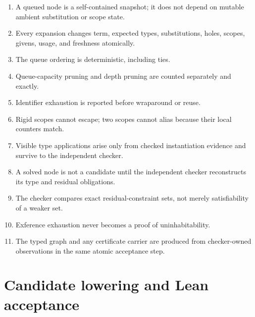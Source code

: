 \documentclass[10pt,letterpaper,oneside]{report}
\begin{document}
\begin{enumerate}
  \item A queued node is a self-contained snapshot; it does not depend on mutable ambient substitution or scope state.
  \item Every expansion changes term, expected types, substitutions, holes, scopes, givens, usage, and freshness atomically.
  \item The queue ordering is deterministic, including ties.
  \item Queue-capacity pruning and depth pruning are counted separately and exactly.
  \item Identifier exhaustion is reported before wraparound or reuse.
  \item Rigid scopes cannot escape; two scopes cannot alias because their local counters match.
  \item Visible type applications arise only from checked instantiation evidence and survive to the independent checker.
  \item A solved node is not a candidate until the independent checker reconstructs its type and residual obligations.
  \item The checker compares exact residual-constraint sets, not merely satisfiability of a weaker set.
  \item Exference exhaustion never becomes a proof of uninhabitability.
  \item The typed graph and any certificate carrier are produced from checker-owned observations in the same atomic acceptance step.
\end{enumerate}

\section{Candidate lowering and Lean acceptance}
\end{document}
